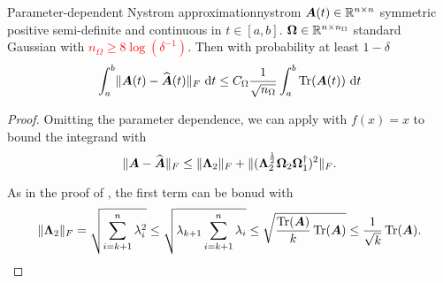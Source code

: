 \documentclass[12pt]{article}
\begin{document}
\begin{lemma}{Parameter-dependent Nystrom approximation}{nystrom}
    $\boldsymbol{A}(t) \in \mathbb{R}^{n \times n}$ symmetric positive semi-definite and continuous in $t \in [a, b]$. $\boldsymbol{\Omega} \in \mathbb{R}^{n \times n_{\Omega}}$ standard Gaussian with \textcolor{red}{$n_{\Omega} \geq 8 \log(\delta^{-1})$}. Then with probability at least $1 - \delta$
    \begin{equation}
        \int_{a}^{b} \lVert \boldsymbol{A}(t) - \widehat{\boldsymbol{A}}(t) \rVert _F ~\mathrm{d}t
        \leq C_{\Omega}\frac{1}{\sqrt{n_{\Omega}}} \int_{a}^{b} \operatorname{Tr}(\boldsymbol{A}(t)) ~\mathrm{d}t 
    \end{equation}
\end{lemma}


\begin{proof}
    Omitting the parameter dependence, we can apply \cite[Theorem B.1]{persson-2023-randomized-lowrank} with $f(x) = x$ to bound the integrand with
    \begin{equation}
        \lVert \boldsymbol{A} - \widehat{\boldsymbol{A}} \rVert _F 
        \leq  \lVert \boldsymbol{\Lambda}_2 \rVert _F + \lVert (\boldsymbol{\Lambda}_2^{\frac{1}{2}} \boldsymbol{\Omega}_2 \boldsymbol{\Omega}_1^{\dagger} )^2 \rVert _F.
    \end{equation}
    
    As in the proof of \cite[Lemma 3]{meyer-2021-hutch-optimal}, the first term can be bonud with
    \begin{equation}
        \lVert \boldsymbol{\Lambda}_2 \rVert _F
        = \sqrt{\sum_{i=k+1}^{n} \lambda_i^2}
        \leq \sqrt{ \lambda_{k+1} \sum_{i=k+1}^{n} \lambda_i}
        \leq \sqrt{ \frac{\operatorname{Tr}(\boldsymbol{A})}{k} \operatorname{Tr}(\boldsymbol{A})}
        \leq \frac{1}{\sqrt{k}} \operatorname{Tr}(\boldsymbol{A}).
    \end{equation}


\end{proof}
\end{document}
